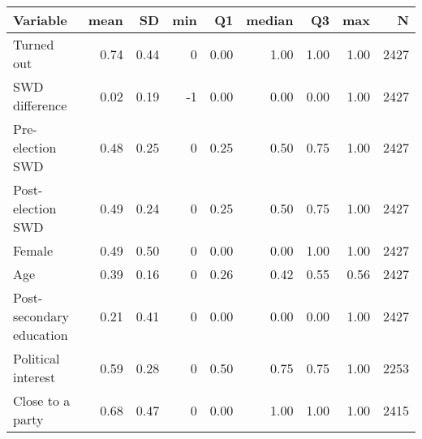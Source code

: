 
\begin{tabular}{l|r|r|r|r|r|r|r|r}
\hline
Variable & mean & SD & min & Q1 & median & Q3 & max & N\\
\hline
Turned out & 0.74 & 0.44 & 0 & 0.00 & 1.00 & 1.00 & 1.00 & 2427\\
\hline
SWD difference & 0.02 & 0.19 & -1 & 0.00 & 0.00 & 0.00 & 1.00 & 2427\\
\hline
Pre-election SWD & 0.48 & 0.25 & 0 & 0.25 & 0.50 & 0.75 & 1.00 & 2427\\
\hline
Post-election SWD & 0.49 & 0.24 & 0 & 0.25 & 0.50 & 0.75 & 1.00 & 2427\\
\hline
Female & 0.49 & 0.50 & 0 & 0.00 & 0.00 & 1.00 & 1.00 & 2427\\
\hline
Age & 0.39 & 0.16 & 0 & 0.26 & 0.42 & 0.55 & 0.56 & 2427\\
\hline
Post-secondary education & 0.21 & 0.41 & 0 & 0.00 & 0.00 & 0.00 & 1.00 & 2427\\
\hline
Political interest & 0.59 & 0.28 & 0 & 0.50 & 0.75 & 0.75 & 1.00 & 2253\\
\hline
Close to a party & 0.68 & 0.47 & 0 & 0.00 & 1.00 & 1.00 & 1.00 & 2415\\
\hline
\end{tabular}
